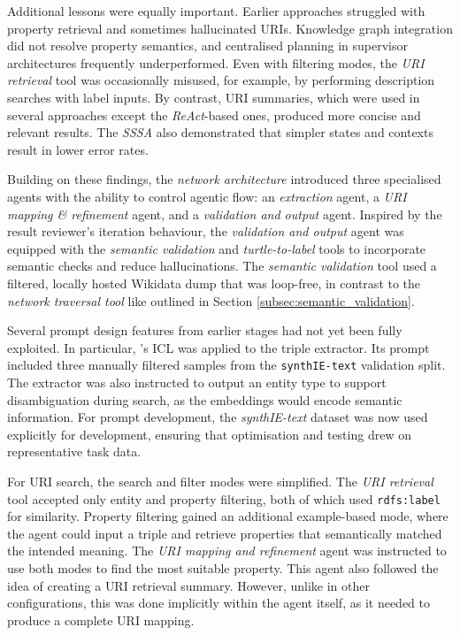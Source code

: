 \documentclass[a4paper,oneside,bibliography=totoc]{scrbook}
\begin{document}
Additional lessons were equally important. Earlier approaches struggled with property retrieval and sometimes hallucinated \acp{URI}. Knowledge graph integration did not resolve property semantics, and centralised planning in supervisor architectures frequently underperformed. Even with filtering modes, the \textit{\ac{URI} retrieval} tool was occasionally misused, for example, by performing description searches with label inputs. By contrast, \ac{URI} summaries, which were used in several approaches except the \textit{ReAct}-based ones, produced more concise and relevant results. The \textit{\ac{SSSA}} also demonstrated that simpler states and contexts result in lower error rates.

Building on these findings, the \textit{network architecture} introduced three specialised agents with the ability to control agentic flow: an \textit{extraction} agent, a \textit{\ac{URI} mapping \& refinement} agent, and a \textit{validation and output} agent. Inspired by the result reviewer's iteration behaviour, the \textit{validation and output} agent was equipped with the \textit{semantic validation} and \textit{turtle-to-label} tools to incorporate semantic checks and reduce hallucinations. The \textit{semantic validation} tool used a filtered, locally hosted Wikidata dump that was loop-free, in contrast to the \textit{network traversal tool} like outlined in Section \ref{subsec:semantic_validation}.

Several prompt design features from earlier stages had not yet been fully exploited. In particular, \citet{Brown2020} 's \ac{ICL} was applied to the triple extractor. Its prompt included three manually filtered samples from the \texttt{synthIE-text} validation split. The extractor was also instructed to output an entity type to support disambiguation during search, as the embeddings would encode semantic information. For prompt development, the \textit{synthIE-text} dataset was now used explicitly for development, ensuring that optimisation and testing drew on representative task data.

For \ac{URI} search, the search and filter modes were simplified. The \textit{\ac{URI} retrieval} tool accepted only entity and property filtering, both of which used \texttt{rdfs:label} for similarity. Property filtering gained an additional example-based mode, where the agent could input a triple and retrieve properties that semantically matched the intended meaning. The \textit{\ac{URI} mapping and refinement} agent was instructed to use both modes to find the most suitable property. This agent also followed the idea of creating a \ac{URI} retrieval summary. However, unlike in other configurations, this was done implicitly within the agent itself, as it needed to produce a complete \ac{URI} mapping.
\end{document}
